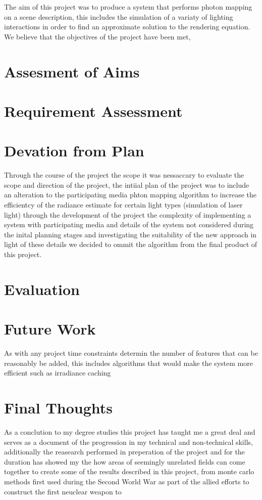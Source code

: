The aim of this project was to produce a system that performs photon mapping on a scene description, this includes the simulation of
a variaty of lighting interactions in order to find an approximate solution to the rendering equation. We believe that the objectives
of the project have been met, 

\section{Assesment of Aims}

\section{Requirement Assessment}

\section{Devation from Plan}
Through the course of the project the scope it was nessaccary to evaluate the scope and direction of the project, the intiial plan
of the project was to include an alteration to the participating media phton mapping algorithm to increase the efficientcy of the
radiance estimate for certain light types (simulation of laser light) through the development of the project the complexity of
implementing a system with participating media and details of the system not considered during the inital planning stages and
investigating the suitability of the new approach in light of these details we decided to ommit the algorithm from the final product
of this project.

\section{Evaluation}

\section{Future Work}
As with any project time constraints determin the number of features that can be reasonably be added, this includes algorithms that
would make the system more efficient such as irradiance caching 

\section{Final Thoughts}
As a conclution to my degree studies this project has taught me a great deal and serves as a document of the progression in my technical and
non-technical skills, additionally the reasearch performed in preperation of the project and for the duration has showed my the
how areas of seemingly unrelated fields can come together to create some of the results described in this project, from monte carlo methods
first used during the Second World War as part of the allied efforts to construct the first neuclear weapon to 
